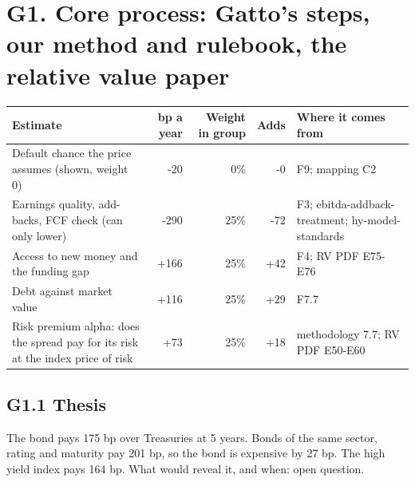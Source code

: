 \documentclass[11pt,a4paper]{article}
\begin{document}
\section*{G1. Core process: Gatto's steps, our method and rulebook, the relative value paper}
\par\noindent{}
\begin{center}\footnotesize\setlength{\tabcolsep}{3.5pt}\begin{tabular}{@{}p{6.2cm}rrrp{4.2cm}@{}}\toprule
Estimate & bp a year & Weight in group & Adds & Where it comes from \\\midrule
Default chance the price assumes (shown, weight 0) & -20 & 0\% & -0 & F9; mapping C2 \\
Earnings quality, add-backs, FCF check (can only lower) & -290 & 25\% & -72 & F3; ebitda-addback-treatment; hy-model-standards \\
Access to new money and the funding gap & +166 & 25\% & +42 & F4; RV PDF E75-E76 \\
Debt against market value & +116 & 25\% & +29 & F7.7 \\
Risk premium alpha: does the spread pay for its risk at the index price of risk & +73 & 25\% & +18 & methodology 7.7; RV PDF E50-E60 \\
\bottomrule\end{tabular}\end{center}
\subsection*{G1.1 Thesis}
The bond pays 175 bp over Treasuries at 5 years. Bonds of the same sector, rating and maturity pay 201 bp, so the bond is expensive by 27 bp. The high yield index pays 164 bp. What would reveal it, and when: open question.
\end{document}
